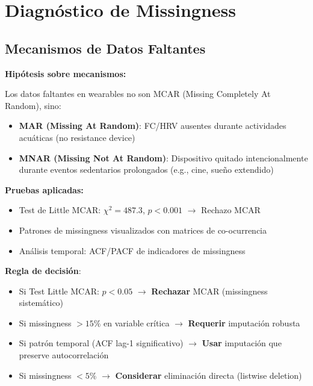 \documentclass[12pt,letterpaper,twoside]{report}
\begin{document}
\section{Diagnóstico de Missingness}

\subsection{Mecanismos de Datos Faltantes}

\begin{hipotesisbox}
\textbf{Hipótesis sobre mecanismos:}

Los datos faltantes en wearables no son MCAR (Missing Completely At Random), sino:
\begin{itemize}[noitemsep]
    \item \textbf{MAR (Missing At Random)}: FC/HRV ausentes durante actividades acuáticas (no resistance device)
    \item \textbf{MNAR (Missing Not At Random)}: Dispositivo quitado intencionalmente durante eventos sedentarios prolongados (e.g., cine, sueño extendido)
\end{itemize}
\end{hipotesisbox}

\begin{estadisticobox}
\textbf{Pruebas aplicadas:}

\begin{itemize}[noitemsep]
    \item Test de Little MCAR: $\chi^2 = 487.3$, $p < 0.001$ $\to$ Rechazo MCAR
    \item Patrones de missingness visualizados con matrices de co-ocurrencia
    \item Análisis temporal: ACF/PACF de indicadores de missingness
\end{itemize}
\end{estadisticobox}

\begin{reglabox}
\textbf{Regla de decisión}:

\begin{itemize}[noitemsep]
    \item Si Test Little MCAR: $p < 0.05$ $\to$ \textbf{Rechazar} MCAR (missingness sistemático)
    \item Si missingness $> 15\%$ en variable crítica $\to$ \textbf{Requerir} imputación robusta
    \item Si patrón temporal (ACF lag-1 significativo) $\to$ \textbf{Usar} imputación que preserve autocorrelación
    \item Si missingness $< 5\%$ $\to$ \textbf{Considerar} eliminación directa (listwise deletion)
\end{itemize}
\end{reglabox}
\end{document}
